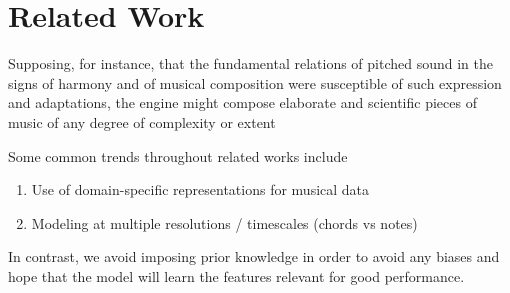 \chapter{Related Work}
\begin{savequote}[75mm]
  Supposing, for instance, that the fundamental relations of pitched sound in the
  signs of harmony and of musical composition were susceptible of such expression and
  adaptations, the engine might compose elaborate and scientific pieces of music
  of any degree of complexity or extent
\end{savequote}




\ifpdf
    \graphicspath{{Chapter3/Figs/Raster/}{Chapter3/Figs/PDF/}{Chapter3/Figs/}}
\else
    \graphicspath{{Chapter3/Figs/Vector/}{Chapter3/Figs/}}
\fi



Some common trends throughout related works include
\begin{enumerate}
  \item Use of domain-specific representations for musical data
  \item Modeling at multiple resolutions / timescales (\ie chords vs notes)
\end{enumerate}
In contrast, we avoid imposing prior knowledge in order to avoid any biases
and hope that the model will learn the features relevant for good performance.

